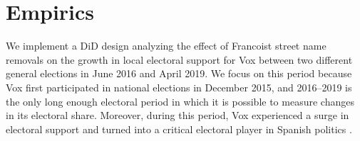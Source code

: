 \documentclass[12pt, titlepage]{article}
\let\footnote=\endnote
\begin{document}
%




\section*{Empirics}

We implement a DiD design analyzing the effect of Francoist street name removals on the growth in local electoral support for Vox between two different general elections in June 2016 and April 2019.
We focus on this period because Vox first participated in national elections in December 2015, and 2016--2019 is the only long enough electoral period in which it is possible to measure changes in its electoral share. Moreover, during this period, Vox experienced a surge in electoral support and turned into a critical electoral player in Spanish politics \citep{Turnbull-Dugarte:2020aa}.
\end{document}
